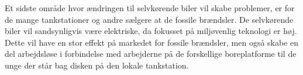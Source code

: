 Et sidste område hvor ændringen til selvkørende biler vil skabe problemer, er for de mange tankstationer og andre sælgere at de fossile brændsler. De selvkørende biler vil sandsynligvis være elektriske, da fokusset på miljøvenlig teknologi er høj. Dette vil have en stor effekt på markedet for fossile brændsler, men også skabe en del arbejdsløse i forbindelse med arbejderne på de forskellige boreplatforme til de unge der står bag disken på den lokale tankstation\cite{GAS}.
